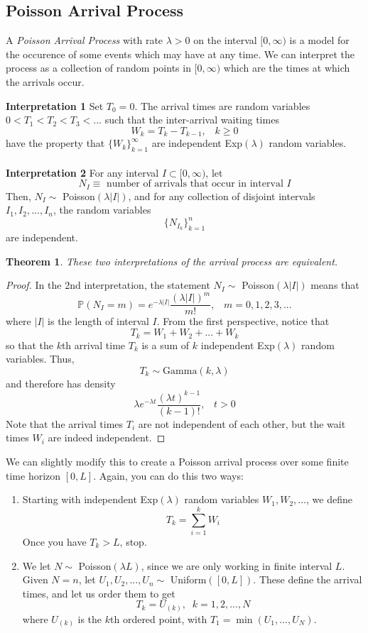 \documentclass{article}
\newtheorem{theorem}{Theorem}[section]
\theoremstyle{remark}
\theoremstyle{definition}
\begin{document}
\subsection{Poisson Arrival Process}
A \textit{Poisson Arrival Process} with rate $\lambda > 0$ on the interval $[0, \infty)$ is a model for the occurence of some events which may have at any time. We can interpret the process as a collection of random points in $[0, \infty)$ which are the times at which the arrivals occur. 

\textbf{Interpretation 1} Set $T_0 = 0$. The arrival times are random variables $0 < T_1 < T_2 < T_3 < ...$ such that the inter-arrival waiting times
\[W_k = T_k - T_{k-1}, \;\;\; k \geq 0\]
have the property that $\{W_k\}_{k=1}^\infty$ are independent Exp$(\lambda)$ random variables. 
\\
\\
\textbf{Interpretation 2} For any interval $I \subset [0, \infty)$, let
\[N_I \equiv \text{ number of arrivals that occur in interval } I\]
Then, $N_I \sim$ Poisson$(\lambda |I|)$, and for any collection of disjoint intervals $I_1, I_2, ..., I_n$, the random variables 
\[\{N_{I_k}\}_{k=1}^n\]
are independent. 

\begin{theorem}
These two interpretations of the arrival process are equivalent. 
\end{theorem}
\begin{proof}
In the 2nd interpretation, the statement $N_I \sim$ Poisson$(\lambda |I|)$ means that 
\[\mathbb{P}(N_I = m) = e^{-\lambda |I|} \frac{(\lambda |I|)^m}{m!}, \;\;\; m = 0, 1, 2, 3, ...\]
where $|I|$ is the length of interval $I$. From the first perspective, notice that 
\[T_k = W_1 + W_2 + ... + W_k\]
so that the $k$th arrival time $T_k$ is a sum of $k$ independent Exp$(\lambda)$ random variables. Thus, 
\[T_k \sim \text{Gamma}(k, \lambda)\]
and therefore has density
\[ \lambda e^{-\lambda t} \frac{(\lambda t)^{k-1}}{(k-1)!}, \;\;\; t>0\]
Note that the arrival times $T_i$ are not independent of each other, but the wait times $W_i$ are indeed independent. 
\end{proof}

We can slightly modify this to create a Poisson arrival process over some finite time horizon $[0, L]$. Again, you can do this two ways: 
\begin{enumerate}
    \item Starting with independent Exp$(\lambda)$ random variables $W_1, W_2, ...$, we define
    \[T_k = \sum_{i=1}^k W_i\]
    Once you have $T_k > L$, stop. 
    \item We let $N \sim$ Poisson$(\lambda L)$, since we are only working in finite interval $L$. Given $N = n$, let $U_1, U_2, ..., U_n \sim$ Uniform$([0, L])$. These define the arrival times, and let us order them to get
    \[T_k = U_{(k)}, \;\; k = 1, 2, ..., N\]
    where $U_{(k)}$ is the $k$th ordered point, with $T_1 = \min(U_1, ..., U_N)$. 
\end{enumerate}
\end{document}
